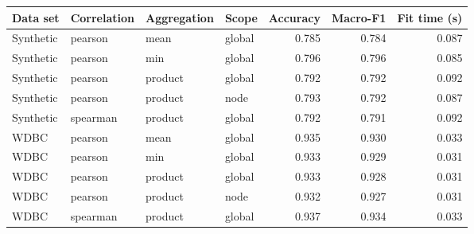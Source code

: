 \begin{tabular}{llllrrr}
\toprule
Data set & Correlation & Aggregation & Scope & Accuracy & Macro-F1 & Fit time (s) \\
\midrule
Synthetic & pearson & mean & global & 0.785 & 0.784 & 0.087 \\
Synthetic & pearson & min & global & 0.796 & 0.796 & 0.085 \\
Synthetic & pearson & product & global & 0.792 & 0.792 & 0.092 \\
Synthetic & pearson & product & node & 0.793 & 0.792 & 0.087 \\
Synthetic & spearman & product & global & 0.792 & 0.791 & 0.092 \\
WDBC & pearson & mean & global & 0.935 & 0.930 & 0.033 \\
WDBC & pearson & min & global & 0.933 & 0.929 & 0.031 \\
WDBC & pearson & product & global & 0.933 & 0.928 & 0.031 \\
WDBC & pearson & product & node & 0.932 & 0.927 & 0.031 \\
WDBC & spearman & product & global & 0.937 & 0.934 & 0.033 \\
\bottomrule
\end{tabular}
